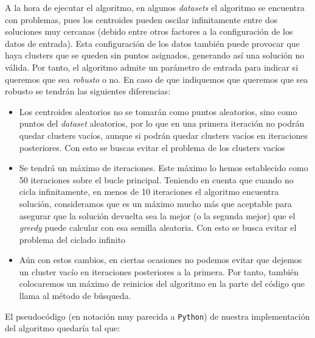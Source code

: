 \documentclass[11pt]{article}
\begin{document}
A la hora de ejecutar el algoritmo, en algunos \emph{datasets} el algoritmo se encuentra con problemas, pues los centroides pueden oscilar infinitamente entre dos soluciones muy cercanas (debido entre otros factores a la configuración de los datos de entrada). Esta configuración de los datos también puede provocar que haya clusters que se queden sin puntos asignados, generando así una solución no válida. Por tanto, el algoritmo admite un parámetro de entrada para indicar si queremos que sea \emph{robusto} o no. En caso de que indiquemos que queremos que sea robusto se tendrán las siguientes diferencias:

\begin{itemize}
    \item Los centroides aleatorios no se tomarán como puntos aleatorios, sino como puntos del \emph{dataset} aleatorios, por lo que en una primera iteración no podrán quedar clusters vacíos, aunque si podrán quedar clusters vacíos en iteraciones posteriores. Con esto se buscas evitar el problema de los clusters vacíos
    \item Se tendrá un máximo de iteraciones. Este máximo lo hemos establecido como 50 iteraciones sobre el bucle principal. Teniendo en cuenta que cuando no cicla infinitamente, en menos de 10 iteraciones el algoritmo encuentra solución, consideramos que es un máximo mucho más que aceptable para asegurar que la solución devuelta sea la mejor (o la segunda mejor) que el \emph{greedy} puede calcular con esa semilla aleatoria. Con esto se busca evitar el problema del ciclado infinito
    \item Aún con estos cambios, en ciertas ocasiones no podemos evitar que dejemos un cluster vacío en iteraciones posteriores a la primera. Por tanto, también colocaremos un máximo de reinicios del algoritmo en la parte del código que llama al método de búsqueda.
\end{itemize}

El pseudocódigo (en notación muy parecida a \lstinline{Python}) de nuestra implementación del algoritmo quedaría tal que:
\end{document}
